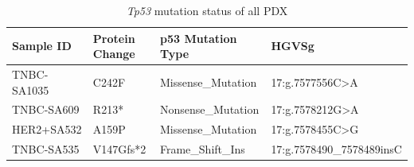  \begin{table}[htbp]
   \centering
   \caption{\textit{Tp53} mutation status of all PDX}
     \begin{tabular}{|l|l|l|l|}
     \hline
     Sample ID & Protein Change & p53 Mutation Type & HGVSg \\
     \hline
    TNBC-SA1035  & C242F & Missense\_Mutation & 17:g.7577556C>A \\
     TNBC-SA609 & R213* & Nonsense\_Mutation & 17:g.7578212G>A \\
     HER2+SA532 & A159P & Missense\_Mutation & 17:g.7578455C>G \\
     TNBC-SA535 & V147Gfs*2 & Frame\_Shift\_Ins & 17:g.7578490\_7578489insC \\
     \hline
     \end{tabular}%
   \label{tab:Tp53mutationofPDX}%
 \end{table}%


